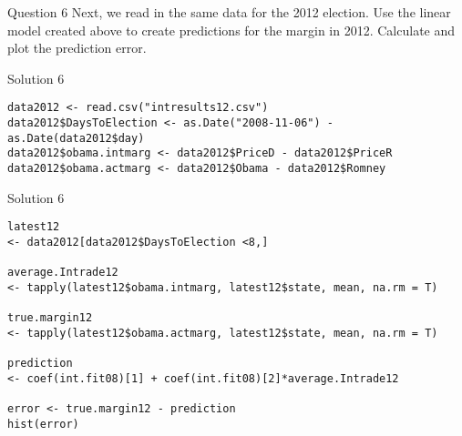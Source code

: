 \documentclass[presentation]{beamer}
\begin{document}
\begin{frame}[label={sec:org3db6b5b}]{Question 6}
Next, we read in the same data for the 2012 election. Use the linear model created above to create predictions for the margin in 2012. Calculate and plot the prediction error.
\end{frame}

\begin{frame}[fragile,shrink=25,label={sec:orgde54915}]{Solution 6}
 \begin{verbatim}
data2012 <- read.csv("intresults12.csv")
data2012$DaysToElection <- as.Date("2008-11-06") - as.Date(data2012$day)
data2012$obama.intmarg <- data2012$PriceD - data2012$PriceR
data2012$obama.actmarg <- data2012$Obama - data2012$Romney
\end{verbatim}
\end{frame}


\begin{frame}[fragile,shrink=25,label={sec:orga9e43be}]{Solution 6}
 \begin{verbatim}
latest12
<- data2012[data2012$DaysToElection <8,]

average.Intrade12
<- tapply(latest12$obama.intmarg, latest12$state, mean, na.rm = T)

true.margin12
<- tapply(latest12$obama.actmarg, latest12$state, mean, na.rm = T)

prediction
<- coef(int.fit08)[1] + coef(int.fit08)[2]*average.Intrade12

error <- true.margin12 - prediction
hist(error)
\end{verbatim}
\end{frame}
\end{document}
